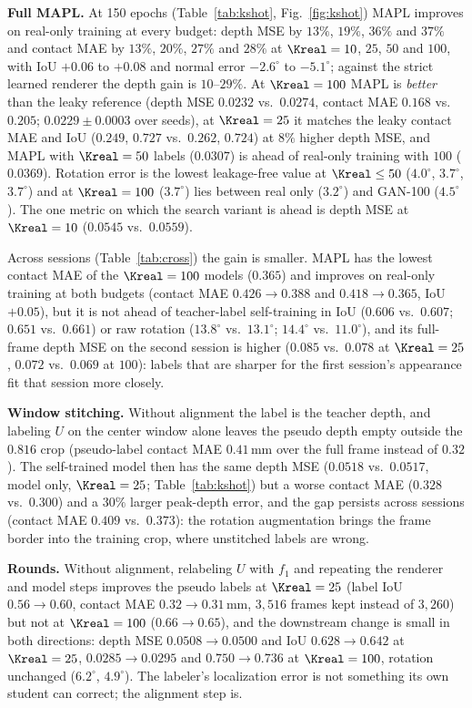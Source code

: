 \noindent\textbf{Full MAPL.} At 150 epochs (Table~\ref{tab:kshot}, Fig.~\ref{fig:kshot}) MAPL improves on real-only training at every budget: depth MSE by $13\%$, $19\%$, $36\%$ and $37\%$ and contact MAE by $13\%$, $20\%$, $27\%$ and $28\%$ at $\Kreal=10$, $25$, $50$ and $100$, with IoU $+0.06$ to $+0.08$ and normal error $-2.6^\circ$ to $-5.1^\circ$; against the strict learned renderer the depth gain is $10$--$29\%$. At $\Kreal=100$ MAPL is \emph{better} than the leaky reference (depth MSE $0.0232$ vs.\ $0.0274$, contact MAE $0.168$ vs.\ $0.205$; $0.0229\pm0.0003$ over seeds), at $\Kreal=25$ it matches the leaky contact MAE and IoU ($0.249$, $0.727$ vs.\ $0.262$, $0.724$) at $8\%$ higher depth MSE, and MAPL with $\Kreal=50$ labels ($0.0307$) is ahead of real-only training with $100$ ($0.0369$). Rotation error is the lowest leakage-free value at $\Kreal\le50$ ($4.0^\circ$, $3.7^\circ$, $3.7^\circ$) and at $\Kreal=100$ ($3.7^\circ$) lies between real only ($3.2^\circ$) and GAN-100 ($4.5^\circ$). The one metric on which the search variant is ahead is depth MSE at $\Kreal=10$ ($0.0545$ vs.\ $0.0559$).

Across sessions (Table~\ref{tab:cross}) the gain is smaller. MAPL has the lowest contact MAE of the $\Kreal=100$ models ($0.365$) and improves on real-only training at both budgets (contact MAE $0.426\!\to\!0.388$ and $0.418\!\to\!0.365$, IoU $+0.05$), but it is not ahead of teacher-label self-training in IoU ($0.606$ vs.\ $0.607$; $0.651$ vs.\ $0.661$) or raw rotation ($13.8^\circ$ vs.\ $13.1^\circ$; $14.4^\circ$ vs.\ $11.0^\circ$), and its full-frame depth MSE on the second session is higher ($0.085$ vs.\ $0.078$ at $\Kreal=25$, $0.072$ vs.\ $0.069$ at $100$): labels that are sharper for the first session's appearance fit that session more closely.

\noindent\textbf{Window stitching.} Without alignment the label is the teacher depth, and labeling $U$ on the center window alone leaves the pseudo depth empty outside the $0.816$ crop (pseudo-label contact MAE $0.41\,$mm over the full frame instead of $0.32$). The self-trained model then has the same depth MSE ($0.0518$ vs.\ $0.0517$, model only, $\Kreal=25$; Table~\ref{tab:kshot}) but a worse contact MAE ($0.328$ vs.\ $0.300$) and a $30\%$ larger peak-depth error, and the gap persists across sessions (contact MAE $0.409$ vs.\ $0.373$): the rotation augmentation brings the frame border into the training crop, where unstitched labels are wrong.

\noindent\textbf{Rounds.} Without alignment, relabeling $U$ with $f_1$ and repeating the renderer and model steps improves the pseudo labels at $\Kreal=25$ (label IoU $0.56\!\to\!0.60$, contact MAE $0.32\!\to\!0.31\,$mm, $3{,}516$ frames kept instead of $3{,}260$) but not at $\Kreal=100$ ($0.66\!\to\!0.65$), and the downstream change is small in both directions: depth MSE $0.0508\!\to\!0.0500$ and IoU $0.628\!\to\!0.642$ at $\Kreal=25$, $0.0285\!\to\!0.0295$ and $0.750\!\to\!0.736$ at $\Kreal=100$, rotation unchanged ($6.2^\circ$, $4.9^\circ$). The labeler's localization error is not something its own student can correct; the alignment step is.

